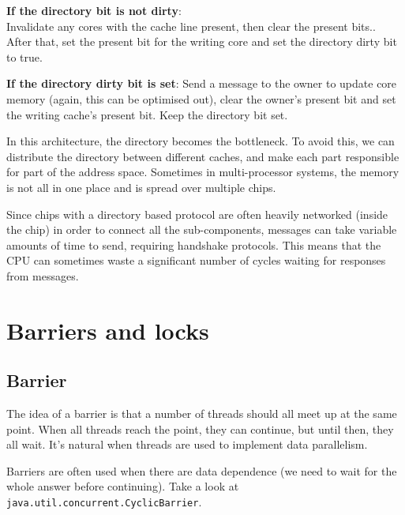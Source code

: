 \begin{description}
\begin{itemize}
      \begin{description}
        \item \textbf{If the directory bit is not dirty}:\\
          Invalidate any cores with the cache line present, then clear the
          present bits.. After that, set the present bit for the writing core
          and set the directory dirty bit to true.
        \item \textbf{If the directory dirty bit is set}:
          Send a message to the owner to update core memory (again, this can
          be optimised out), clear the owner's present bit and set the
          writing cache's present bit. Keep the directory bit set.
      \end{description}
    \end{itemize}
\end{description}

In this architecture, the directory becomes the bottleneck. To avoid this, we
can distribute the directory between different caches, and make each part
responsible for part of the address space. Sometimes in multi-processor systems,
the memory is not all in one place and is spread over multiple chips.

Since chips with a directory based protocol are often heavily networked (inside
the chip) in order to connect all the sub-components, messages can take variable
amounts of time to send, requiring handshake protocols. This means that the CPU
can sometimes waste a significant number of cycles waiting for responses from
messages.


\section{Barriers and locks}

\subsection{Barrier}

The idea of a barrier is that a number of threads should all meet up at the same
point. When all threads reach the point, they can continue, but until then, they
all wait. It's natural when threads are used to implement data parallelism.

Barriers are often used when there are data dependence (we need to wait for the
whole answer before continuing). Take a look at
\texttt{java.util.concurrent.CyclicBarrier}.

